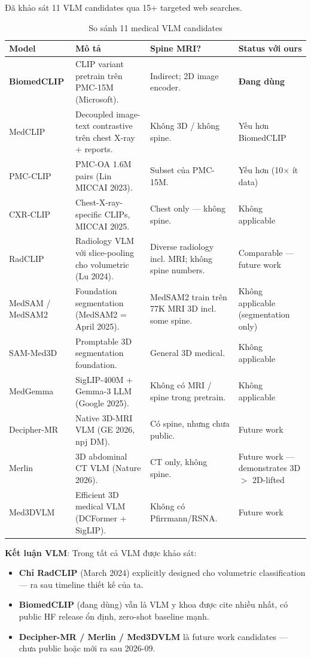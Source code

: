 \documentclass[11pt,a4paper]{article}
\newcommand{\bad}[1]{\textcolor{bad}{#1}}
\newcommand{\best}[1]{\textcolor{best}{\textbf{#1}}}
\begin{document}
\noindent Đã khảo sát 11 VLM candidates qua 15+ targeted web searches.

\begin{table}[h]
\centering
\caption{So sánh 11 medical VLM candidates}
\small
\begin{tabular}{@{}p{2.5cm}p{4.5cm}p{3.5cm}p{3cm}@{}}
\toprule
\rowcolor{tablehdr}
Model & Mô tả & Spine MRI? & Status với ours \\
\midrule
\best{BiomedCLIP} & CLIP variant pretrain trên PMC-15M (Microsoft). & Indirect; 2D image encoder. & \best{Đang dùng} \\
MedCLIP & Decoupled image-text contrastive trên chest X-ray + reports. & Không 3D / không spine. & \bad{Yếu hơn BiomedCLIP} \\
PMC-CLIP & PMC-OA 1.6M pairs (Lin MICCAI 2023). & Subset của PMC-15M. & Yếu hơn (10$\times$ ít data) \\
CXR-CLIP & Chest-X-ray-specific CLIPs, MICCAI 2025. & Chest only --- không spine. & Không applicable \\
RadCLIP & Radiology VLM với slice-pooling cho volumetric (Lu 2024). & Diverse radiology incl. MRI; không spine numbers. & Comparable --- future work \\
MedSAM / MedSAM2 & Foundation segmentation (MedSAM2 = April 2025). & MedSAM2 train trên 77K MRI 3D incl. some spine. & Không applicable (segmentation only) \\
SAM-Med3D & Promptable 3D segmentation foundation. & General 3D medical. & Không applicable \\
MedGemma & SigLIP-400M + Gemma-3 LLM (Google 2025). & \bad{Không có MRI / spine trong pretrain.} & Không applicable \\
Decipher-MR & Native 3D-MRI VLM (GE 2026, npj DM). & Có spine, nhưng chưa public. & Future work \\
Merlin & 3D abdominal CT VLM (Nature 2026). & CT only, không spine. & Future work --- demonstrates 3D $>$ 2D-lifted \\
Med3DVLM & Efficient 3D medical VLM (DCFormer + SigLIP). & Không có Pfirrmann/RSNA. & Future work \\
\bottomrule
\end{tabular}
\end{table}

\noindent\textbf{Kết luận VLM}: Trong tất cả VLM được khảo sát:
\begin{itemize}[leftmargin=*]
\item \textbf{Chỉ RadCLIP} (March 2024) explicitly designed cho
volumetric classification --- ra sau timeline thiết kế của ta.
\item \textbf{BiomedCLIP} (đang dùng) vẫn là VLM y khoa được cite
nhiều nhất, có public HF release ổn định, zero-shot baseline mạnh.
\item \textbf{Decipher-MR / Merlin / Med3DVLM} là future work
candidates --- chưa public hoặc mới ra sau 2026-09.
\end{itemize}
\end{document}

